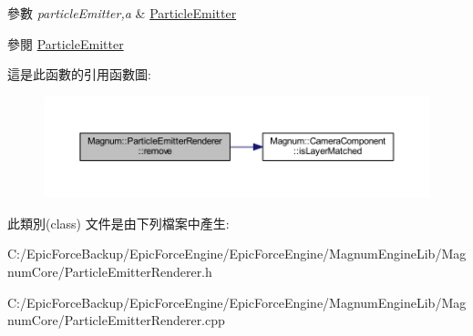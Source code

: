 \begin{DoxyParams}{參數}
{\em particle\+Emitter,a} & \hyperlink{class_magnum_1_1_particle_emitter}{Particle\+Emitter} \\
\hline
\end{DoxyParams}
\begin{DoxySeeAlso}{參閱}
\hyperlink{class_magnum_1_1_particle_emitter}{Particle\+Emitter} 
\end{DoxySeeAlso}


這是此函數的引用函數圖\+:\nopagebreak
\begin{figure}[H]
\begin{center}
\leavevmode
\includegraphics[width=350pt]{class_magnum_1_1_particle_emitter_renderer_a1c48314c5386716962d6859e4c546ef1_cgraph}
\end{center}
\end{figure}




此類別(class) 文件是由下列檔案中產生\+:\begin{DoxyCompactItemize}
\item 
C\+:/\+Epic\+Force\+Backup/\+Epic\+Force\+Engine/\+Epic\+Force\+Engine/\+Magnum\+Engine\+Lib/\+Magnum\+Core/Particle\+Emitter\+Renderer.\+h\item 
C\+:/\+Epic\+Force\+Backup/\+Epic\+Force\+Engine/\+Epic\+Force\+Engine/\+Magnum\+Engine\+Lib/\+Magnum\+Core/Particle\+Emitter\+Renderer.\+cpp\end{DoxyCompactItemize}
